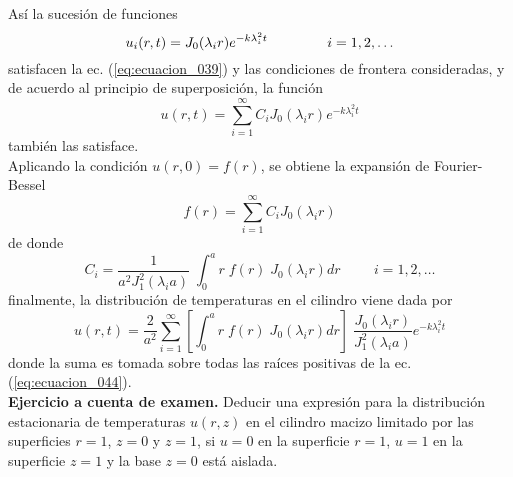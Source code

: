 Así la sucesión de funciones
\[ u_{i}(r,t) = J_{0} (\lambda_{i} r) e^{-k \lambda_{i}^{2} t} \hspace{1.5cm} i= 1, 2, \ldots \]
satisfacen la ec. (\ref{eq:ecuacion_039}) y las condiciones de frontera consideradas, y de acuerdo al principio de superposición, la función
\begin{equation}
u(r,t) =  \sum_{i=1}^{\infty} C_{i} J_{0} (\lambda_{i} r)e^{-k \lambda_{i}^{2} t}
\label{eq:ecuacion_045}
\end{equation}
también las satisface.
\\
Aplicando la condición $u(r,0) = f(r)$, se obtiene la expansión de Fourier-Bessel
\[ f(r) = \sum_{i=1}^{\infty} C_{i} J_{0}(\lambda_{i} r) \]
de donde
\[ C_{i} = \dfrac{1}{a^{2} J_{1}^{2} (\lambda_{i} a)} \; \int_{0}^{a} r \; f(r) \; J_{0}(\lambda_{i} r) dr \hspace{1cm} i = 1,2, \ldots \]
finalmente, la distribución de temperaturas en el cilindro viene dada por
\begin{equation}
u(r,t) = \dfrac{2}{a^{2}} \sum_{i = 1}^{\infty } \left[ \int_{0}^{a} r \; f(r) \; J_{0}(\lambda_{i} r) dr \right] \; \dfrac{J_{0}(\lambda_{i} r)} {J_{1}^{2} (\lambda_{i} a)} e^{-k \lambda_{i}^{2} t}
\label{eq:ecuacion_046}
\end{equation}
donde la suma es tomada sobre todas las raíces positivas de la ec. (\ref{eq:ecuacion_044}).
\\
\textbf{Ejercicio a cuenta de examen.} Deducir una expresión para la distribución estacionaria de temperaturas $u(r, z)$ en el cilindro macizo limitado por las superficies $r = 1$, $z = 0$ y $z = 1$, si $u = 0$ en la superficie $r= 1$, $u = 1$ en la superficie $z = 1$ y la base $z = 0$ está aislada.
